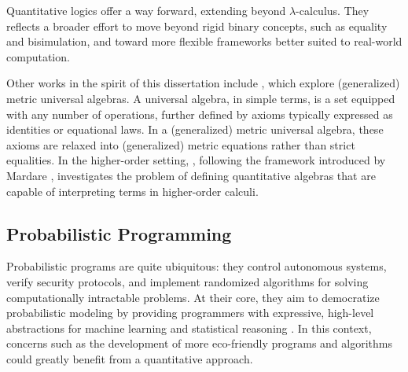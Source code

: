 Quantitative logics offer a way forward, extending beyond  $\lambda$-calculus. They reflects a broader effort to move beyond rigid binary concepts, such as equality and bisimulation, and toward more flexible frameworks better suited to real-world computation.

Other works in the spirit of this dissertation include \cite{mardare2016quantitative, mardare2017axiomatizability, mio24, jurka24}, which explore (generalized) metric universal algebras. A universal algebra, in simple terms, is a set equipped with any number of operations, further defined  by axioms typically expressed as identities or equational laws. In a (generalized) metric universal algebra, these axioms are relaxed into (generalized) metric equations rather than strict equalities. In the higher-order setting, \cite{lago22}, following the framework introduced by Mardare \cite{mardare2016quantitative}, investigates the problem of defining quantitative algebras that are capable of interpreting terms in higher-order calculi.






\subsection*{Probabilistic Programming}

Probabilistic programs are quite  ubiquitous: they control autonomous systems, verify security protocols, and implement randomized algorithms for solving computationally intractable problems. At their core, they aim to democratize probabilistic modeling by providing programmers with expressive, high-level abstractions for machine learning and statistical reasoning \cite{bartheFoundationsProbabilisticProgramming2020}. In this context, concerns such as the development of more eco-friendly programs and algorithms could greatly benefit from a quantitative approach.







